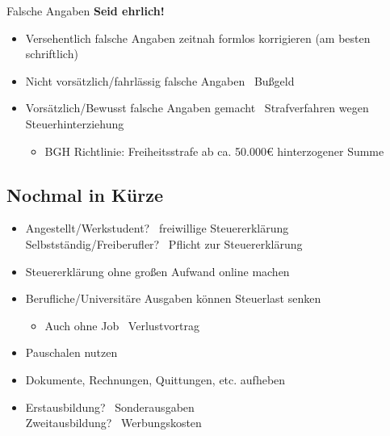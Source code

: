 \documentclass{beamer}
\newcommand{\n}{\hfill\\\vspace{0.25cm}}
\begin{document}
			\begin{frame}{Falsche Angaben}
				\textbf{Seid ehrlich!}\n
				\begin{itemize}
					\item Versehentlich falsche Angaben zeitnah formlos korrigieren (am besten schriftlich)
					\item Nicht vorsätzlich/fahrlässig falsche Angaben \textrightarrow\ Bußgeld
					\item Vorsätzlich/Bewusst falsche Angaben gemacht \textrightarrow\ Strafverfahren wegen Steuerhinterziehung
					\begin{itemize}
						\item BGH Richtlinie: Freiheitsstrafe ab ca. 50.000€ hinterzogener Summe
					\end{itemize}
				\end{itemize}
			\end{frame}
		
		\subsection{Nochmal in Kürze}
		
			\begin{frame}
				\begin{itemize}
					\item Angestellt/Werkstudent? \textrightarrow\ freiwillige Steuererklärung\\
					Selbstständig/Freiberufler? \textrightarrow\ Pflicht zur Steuererklärung\pause
					\item Steuererklärung ohne großen Aufwand online machen\pause
					\item Berufliche/Universitäre Ausgaben können Steuerlast senken
					\begin{itemize}
						\item Auch ohne Job \textrightarrow\ Verlustvortrag
					\end{itemize}
					\item Pauschalen nutzen
					\item Dokumente, Rechnungen, Quittungen, etc. aufheben\pause
					\item Erstausbildung? \textrightarrow\ Sonderausgaben\\
					Zweitausbildung? \textrightarrow\ Werbungskosten\vspace{-0.1cm}
				\end{itemize}
			\end{frame}
		
\end{document}

